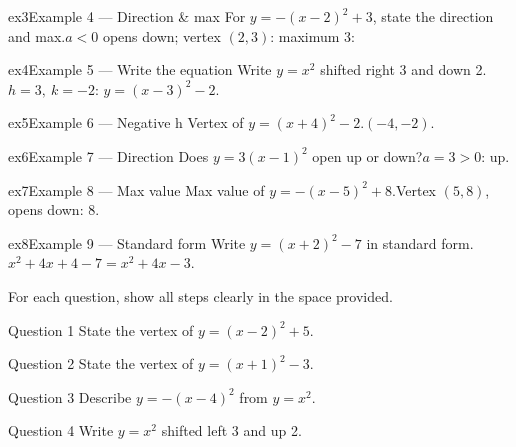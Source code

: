 \documentclass[11pt]{article}
\begin{document}
\begin{example}{ex3}{Example 4 --- Direction \& max}
For $y=-(x-2)^2+3$, state the direction and max.\soln $a<0$ opens down; vertex $(2,3)$: maximum 3:
\end{example}

\begin{example}{ex4}{Example 5 --- Write the equation}
Write $y=x^2$ shifted right 3 and down 2.\soln $h=3,\ k=-2$: $y=(x-3)^2-2$.
\end{example}

\begin{example}{ex5}{Example 6 --- Negative h}
Vertex of $y=(x+4)^2-2$.\soln $(-4,-2)$.
\end{example}

\begin{example}{ex6}{Example 7 --- Direction}
Does $y=3(x-1)^2$ open up or down?\soln $a=3>0$: up.
\end{example}

\begin{example}{ex7}{Example 8 --- Max value}
Max value of $y=-(x-5)^2+8$.\soln Vertex $(5,8)$, opens down: $8$.
\end{example}

\begin{example}{ex8}{Example 9 --- Standard form}
Write $y=(x+2)^2-7$ in standard form.\soln $x^2+4x+4-7=x^2+4x-3$.
\end{example}

\clearpage
{}
For each question, show all steps clearly in the space provided.

\begin{qbox}{Question 1}
State the vertex of $y=(x-2)^2+5$.\workspace{2.4cm}
\end{qbox}

\begin{qbox}{Question 2}
State the vertex of $y=(x+1)^2-3$.\workspace{2.4cm}
\end{qbox}

\begin{qbox}{Question 3}
Describe $y=-(x-4)^2$ from $y=x^2$.\workspace{2.4cm}
\end{qbox}

\begin{qbox}{Question 4}
Write $y=x^2$ shifted left 3 and up 2.\workspace{2.4cm}
\end{qbox}
\end{document}
